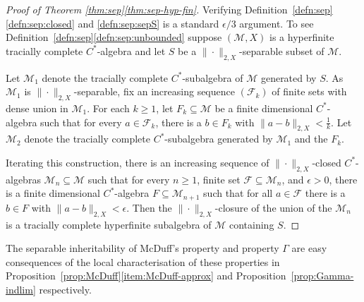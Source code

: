 \documentclass[a4paper,11pt]{amsart}
\theoremstyle{definition}
\numberwithin{equation}{section}
\numberwithin{theorem}{section}
\newcommand{\M}{\mathcal{M}}
\begin{document}
\begin{proof}[Proof of Theorem \ref{thm:sep}\ref{thm:sep-hyp-fin}]
	Verifying Definition~\ref{defn:sep}\ref{defn:sep:closed} and \ref{defn:sep:sepS} is a standard $\epsilon/3$ argument.  To see Definition~\ref{defn:sep}\ref{defn:sep:unbounded} suppose $(\M, X)$ is a hyperfinite tracially complete $C^*$-algebra and let $S$ be a $\|\cdot\|_{2, X}$-separable subset of $\mathcal M$.
 
    Let $\mathcal M_1$ denote the tracially complete $C^*$-subalgebra of $\M$ generated by $S$.  As $\mathcal M_1$ is $\|\cdot\|_{2,X}$-separable, fix an increasing sequence $(\mathcal F_k)$ of finite sets with dense union in $\M_1$. For  each $k \geq 1$, let $F_k \subseteq \M$ be a finite dimensional $C^*$-algebra such that for every $a \in \mathcal F_k$, there is a $b \in F_k$ with $\|a - b\|_{2, X} < \frac1k$.  Let $\mathcal M_2$ denote the  tracially complete $C^*$-subalgebra generated by $\M_1$ and the $F_k$.
	
	Iterating this construction, there is an increasing sequence of $\|\cdot\|_{2, X}$-closed $C^*$-algebras $\mathcal M_n \subseteq \M$ such that for every $n \geq 1$, finite set $\mathcal F \subseteq \M_n$, and $\epsilon > 0$, there is a finite dimensional $C^*$-algebra $F \subseteq \M_{n+1}$ such that for all $a \in \mathcal F$ there is a $b \in F$ with $\|a - b\|_{2, X} < \epsilon$.  Then the $\|\cdot\|_{2,X}$-closure of the union of the $\M_n$ is a tracially complete hyperfinite subalgebra of $\M$ containing $S$.
\end{proof}

The separable inheritability of McDuff's property and property $\Gamma$ are easy consequences of the local characterisation of these properties in Proposition~\ref{prop:McDuff}\ref{item:McDuff-approx} and Proposition~\ref{prop:Gamma-indlim} respectively.
\end{document}
